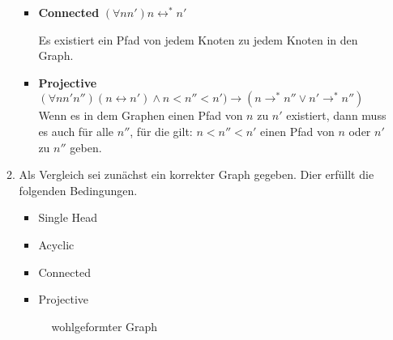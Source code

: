 \documentclass[a4paper]{scrartcl}
\begin{document}
\begin{enumerate}
\begin{enumerate}[label=(\alph*)]
{\begin{itemize}
            \item {\textbf{Connected}    $(\forall n n') n \leftrightarrow^\ast n'$
            
            Es existiert ein Pfad von jedem Knoten zu jedem Knoten in den Graph.
	        }
            
            \item  {\textbf{Projective} $(\forall n n' n'') (n \leftrightarrow n') \land n < n'' < n') \rightarrow (n \rightarrow^\ast n'' \lor n' \rightarrow^\ast n'')$
	        Wenn es in dem Graphen einen Pfad von $n$ zu $n'$ existiert, dann muss es auch für alle
			$n''$, für die gilt: $n < n'' < n'$ einen Pfad von $n$ oder $n'$ zu $n''$ geben.
	        }
		    \end{itemize}
	        }
            
            \item
            Als Vergleich sei zunächst ein korrekter Graph gegeben. Dier erfüllt die folgenden Bedingungen.
            
            \begin{itemize}
            	\item Single Head
            	\item Acyclic
            	\item Connected
            	\item Projective
            \end{itemize}
            
\begin{figure}
	\centering

	
	\caption{wohlgeformter Graph}
	\label{fig:P01}
\end{figure}

\begin{figure}
	\centering
	
    \begin{tikzpicture}[%
        ->,
        >=stealth',
        scale=2,
        semithick,
    ]


\end{tikzpicture}
\end{figure}
\end{enumerate}
\end{enumerate}
\end{document}
